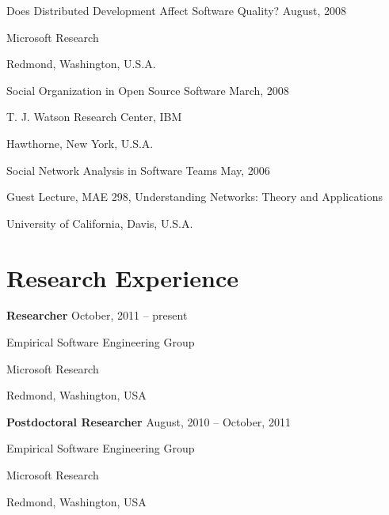 \documentclass[margin,line,article,letterpaper]{res}
\newenvironment{list1}{
  \begin{list}{}{%
      \setlength{\itemsep}{0in}
      \setlength{\parsep}{0in} \setlength{\parskip}{0in}
      \setlength{\topsep}{0in} \setlength{\partopsep}{0in} 
      \setlength{\leftmargin}{0.17in}}}{\end{list}}
\newcommand{\timespan}[1]{#1}
\begin{document}
\begin{resume}
Does Distributed Development Affect Software Quality? \hfill \timespan{August, 2008}\\
\vspace{-10pt}
\begin{list1}
\item Microsoft Research
\item Redmond, Washington, U.S.A.
\end{list1}

Social Organization in Open Source Software \hfill \timespan{March, 2008}\\
\vspace{-10pt}
\begin{list1}
\item T. J. Watson Research Center, IBM
\item Hawthorne, New York, U.S.A.
\end{list1}

Social Network Analysis in Software Teams \hfill \timespan{May, 2006}\\
\vspace{-10pt}
\begin{list1}
\item Guest Lecture, MAE 298, Understanding Networks: Theory and Applications
\item University of California, Davis, U.S.A.
\end{list1}

\section{Research Experience}

\textbf{Researcher} \hfill \timespan{October, 2011 -- present}\\
\vspace{-10pt}
\begin{list1}
\item Empirical Software Engineering Group
\item Microsoft Research
\item Redmond, Washington, USA
\vspace{6pt}
\item  
\end{list1}


\textbf{Postdoctoral Researcher} \hfill \timespan{August, 2010 -- October, 2011}\\
\vspace{-10pt}
\begin{list1}
\item Empirical Software Engineering Group
\item Microsoft Research
\item Redmond, Washington, USA
\vspace{6pt}
\item  
\end{list1}


\end{resume}
\end{document}
